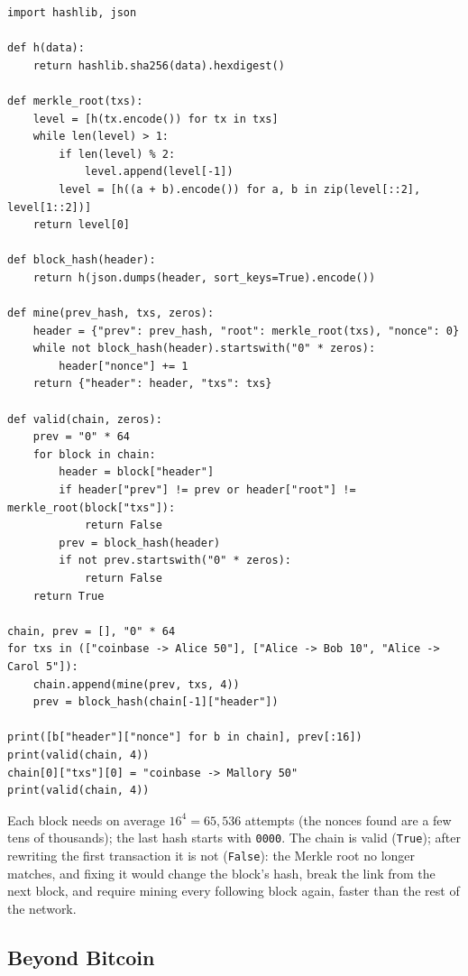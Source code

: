 \begin{verbatim}
import hashlib, json

def h(data):
    return hashlib.sha256(data).hexdigest()

def merkle_root(txs):
    level = [h(tx.encode()) for tx in txs]
    while len(level) > 1:
        if len(level) % 2:
            level.append(level[-1])
        level = [h((a + b).encode()) for a, b in zip(level[::2], level[1::2])]
    return level[0]

def block_hash(header):
    return h(json.dumps(header, sort_keys=True).encode())

def mine(prev_hash, txs, zeros):
    header = {"prev": prev_hash, "root": merkle_root(txs), "nonce": 0}
    while not block_hash(header).startswith("0" * zeros):
        header["nonce"] += 1
    return {"header": header, "txs": txs}

def valid(chain, zeros):
    prev = "0" * 64
    for block in chain:
        header = block["header"]
        if header["prev"] != prev or header["root"] != merkle_root(block["txs"]):
            return False
        prev = block_hash(header)
        if not prev.startswith("0" * zeros):
            return False
    return True

chain, prev = [], "0" * 64
for txs in (["coinbase -> Alice 50"], ["Alice -> Bob 10", "Alice -> Carol 5"]):
    chain.append(mine(prev, txs, 4))
    prev = block_hash(chain[-1]["header"])

print([b["header"]["nonce"] for b in chain], prev[:16])
print(valid(chain, 4))
chain[0]["txs"][0] = "coinbase -> Mallory 50"
print(valid(chain, 4))
\end{verbatim}

Each block needs on average $16^4 = 65{,}536$ attempts (the nonces found are a few tens of thousands); the last hash starts with \texttt{0000}. The chain is valid (\texttt{True}); after rewriting the first transaction it is not (\texttt{False}): the Merkle root no longer matches, and fixing it would change the block's hash, break the link from the next block, and require mining every following block again, faster than the rest of the network.

\subsection{Beyond Bitcoin}

